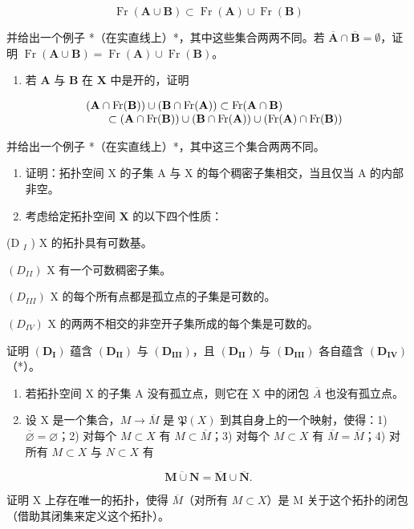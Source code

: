 \[
\operatorname{Fr} (\mathbf {A} \cup \mathbf {B}) \subset \operatorname{Fr} (\mathbf {A}) \cup \operatorname{Fr} (\mathbf {B})
\]

并给出一个例子 *（在实直线上）*，其中这些集合两两不同。若 \(\overline{\mathbf{A}} \cap \overline{\mathbf{B}} = \emptyset\)，证明 \(\operatorname{Fr}(\mathbf{A} \cup \mathbf{B}) = \operatorname{Fr}(\mathbf{A}) \cup \operatorname{Fr}(\mathbf{B})\)。

\begin{enumerate}
\def\labelenumi{\alph{enumi})}
\setcounter{enumi}{2}
\tightlist
\item
  若 \(\mathbf{A}\) 与 \(\mathbf{B}\) 在 \(\mathbf{X}\) 中是开的，证明
\end{enumerate}

\[
\begin{array}{r l} & (\mathbf {A} \cap \operatorname{Fr} (\mathbf {B})) \cup (\mathbf {B} \cap \operatorname{Fr} (\mathbf {A})) \subset \operatorname{Fr} (\mathbf {A} \cap \mathbf {B}) \\ & \qquad \subset (\mathbf {A} \cap \operatorname{Fr} (\mathbf {B})) \cup (\mathbf {B} \cap \operatorname{Fr} (\mathbf {A})) \cup (\operatorname{Fr} (\mathbf {A}) \cap \operatorname{Fr} (\mathbf {B})) \end{array}
\]

并给出一个例子 *（在实直线上）*，其中这三个集合两两不同。

\begin{enumerate}
\def\labelenumi{\arabic{enumi})}
\setcounter{enumi}{5}
\item
  证明：拓扑空间 X 的子集 A 与 X 的每个稠密子集相交，当且仅当 A 的内部非空。
\item
  考虑给定拓扑空间 \(\mathbf{X}\) 的以下四个性质：
\end{enumerate}

(D \(_{I}\) ) X 的拓扑具有可数基。

\((D_{II})\) X 有一个可数稠密子集。

\((D_{III})\) X 的每个所有点都是孤立点的子集是可数的。

\((D_{IV})\) X 的两两不相交的非空开子集所成的每个集是可数的。

证明 \((\mathbf{D}_{\mathbf{I}})\) 蕴含 \((\mathbf{D}_{\mathbf{II}})\) 与 \((\mathbf{D}_{\mathbf{III}})\)，且 \((\mathbf{D}_{\mathbf{II}})\) 与 \((\mathbf{D}_{\mathbf{III}})\) 各自蕴含 \((\mathbf{D}_{\mathbf{IV}})\)（*）。

\begin{enumerate}
\def\labelenumi{\arabic{enumi})}
\setcounter{enumi}{7}
\item
  若拓扑空间 X 的子集 A 没有孤立点，则它在 X 中的闭包 \(\overline{A}\) 也没有孤立点。
\item
  设 X 是一个集合，\(M \to \overline{M}\) 是 \(\mathfrak{P}(X)\) 到其自身上的一个映射，使得：1) \(\overline{\varnothing} = \varnothing\)；2) 对每个 \(M \subset X\) 有 \(M \subset \overline{M}\)；3) 对每个 \(M \subset X\) 有 \(\overline{M} = \overline{M}\)；4) 对所有 \(M \subset X\) 与 \(N \subset X\) 有
\end{enumerate}

\[
\overline {{\mathbf {M} \cup \mathbf {N}}} = \overline {{\mathbf {M}}} \cup \overline {{\mathbf {N}}}.
\]

证明 X 上存在唯一的拓扑，使得 \(\overline{M}\)（对所有 \(M \subset X\)）是 M 关于这个拓扑的闭包（借助其闭集来定义这个拓扑）。


